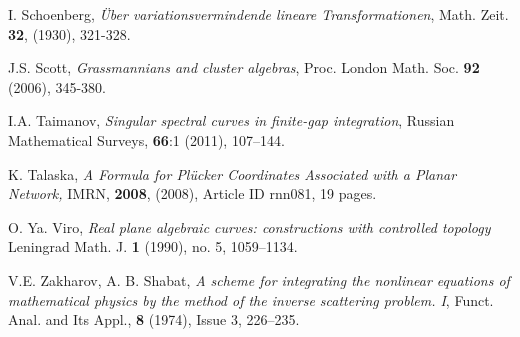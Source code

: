 \documentclass[11pt]{amsart}
\theoremstyle{plain}
\numberwithin{equation}{section}
\begin{document}
\begin{thebibliography}{111}
 I. Schoenberg, {\em \"Uber variationsvermindende lineare Transformationen}, Math. Zeit. {\bf 32}, (1930), 321-328.

 J.S. Scott, {\em Grassmannians and cluster algebras}, Proc. London Math. Soc. {\bf 92} (2006), 345-380.

 I.A. Taimanov, {\em Singular spectral curves in finite-gap integration}, Russian Mathematical Surveys, {\bf 66}:1 (2011), 107--144.

 K. Talaska, {\em A Formula for Pl\"ucker Coordinates Associated with a Planar Network,} IMRN, {\bf 2008}, (2008),  Article ID rnn081, 19 pages.

 O. Ya. Viro, {\em Real plane algebraic curves: constructions with controlled topology} Leningrad Math. J. {\bf 1} (1990), no. 5, 1059--1134.

 V.E. Zakharov, A. B. Shabat, {\em A scheme for integrating the nonlinear equations of mathematical physics by the method of the inverse scattering problem. I}, Funct. Anal. and Its Appl., {\bf 8} (1974), Issue 3, 226--235. 

\end{thebibliography}
\end{document}
